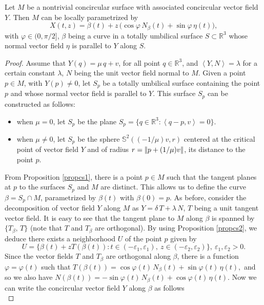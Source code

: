\documentclass[eqnumis, pdf]{hjms}
\def\R#1{\ensuremath{\mathbb{R}^{#1}}}
\def\S#1{\ensuremath{\mathbb{S}^{#1}}}
\def\<{\left<}
\def\>{\right>}
\def\norma#1{|\kern-.3ex|#1|\kern-.3ex|}
\def\e{\varepsilon}
\begin{document}
\begin{theorem}\label{sctheo}
Let $M$ be a nontrivial concircular surface with associated concircular vector field $Y$. Then $M$ can be locally parametrized by
\begin{equation}\label{teoparametrization}
X(t,z)=\beta(t)+z\,\big(\cos\varphi\,N_\beta(t)+\sin\varphi\,\eta(t)\big),
\end{equation}
with $\varphi\in(0,\pi/2]$, $\beta$ being a curve in a totally umbilical surface $S\subset\R{3}$ whose normal vector field $\eta$ is parallel to $Y$ along $S$.
\end{theorem}
\begin{proof}
Assume that $Y(q)=\mu\,q+v$, for all point $q\in\R3$, and $\<Y,N\>=\lambda$ for a certain constant $\lambda$, $N$ being the unit vector field normal to $M$. Given a point $p\in M$, with $Y(p)\neq0$, let $S_p$ be a totally umbilical surface containing the point $p$ and whose normal vector field is parallel to $Y$. This surface $S_p$ can be constructed as follows:
\begin{itemize}
\item when $\mu=0$, let $S_p$ be the plane $S_p=\{q\in\R3:\<q-p,v\>=0\}$.
\item when $\mu\neq0$, let $S_p$ be the sphere $\S{2}((-1/\mu)v,r)$ centered at the critical point of vector field $Y$ and of radius $r=\norma{p+(1/\mu) v}$, its distance to the point $p$.
\end{itemize}
From Proposition \ref{propcs1}, there is a point $p\in M$ such that the tangent planes at $p$ to the surfaces $S_p$ and $M$ are distinct. This allows us to define the curve $\beta=S_p\cap M$, parametrized by $\beta(t)$ with $\beta(0)=p$. As before, consider the decomposition of vector field $Y$ along $M$ as $Y=\delta\,T+\lambda\,N$, $T$ being a unit tangent vector field. It is easy to see that the tangent plane to $M$ along $\beta$ is spanned by  $\{T_\beta,\,T\}$ (note that $T$ and $T_\beta$ are orthogonal). By using Proposition \ref{propcs2}, we deduce there exists a neighborhood $U$ of the point $p$ given by
\[
U=\{\beta(t)+zT(\beta(t)):t\in(-\e_1,\e_1),\ z\in(-\e_2,\e_2)\},\ \e_1,\e_2>0.
\]
Since the vector fields $T$ and $T_\beta$ are orthogonal along $\beta$, there is a function $\varphi=\varphi(t)$ such that
\(
T(\beta(t))=\cos\varphi(t)\,N_\beta(t)+\sin\varphi(t)\,\eta(t),
\)
and so we also have
\(
N(\beta(t))=-\sin\varphi(t)\,N_\beta(t)+\cos\varphi(t)\,\eta(t).
\)
Now we can write the concircular vector field $Y$ along $\beta$  as follows
\begin{equation}\label{Ybeta}

\end{equation}
\end{proof}
\end{document}
